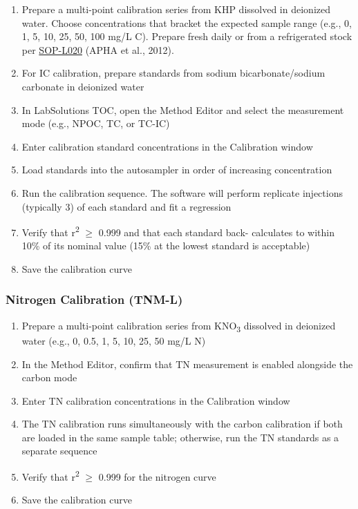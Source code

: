 \documentclass[
  11pt,
  letterpaper,
]{article}
\providecommand{\tightlist}{%
  \setlength{\itemsep}{0pt}\setlength{\parskip}{0pt}}
\begin{document}
\begin{enumerate}
\def\labelenumi{\arabic{enumi}.}
\tightlist
\item
  Prepare a multi-point calibration series from KHP dissolved in
  deionized water. Choose concentrations that bracket the expected
  sample range (e.g., 0, 1, 5, 10, 25, 50, 100 mg/L C). Prepare fresh
  daily or from a refrigerated stock per
  \href{SOP-L020-reagent-standard-preparation.qmd}{SOP-L020} (APHA et
  al., 2012).
\item
  For IC calibration, prepare standards from sodium bicarbonate/sodium
  carbonate in deionized water
\item
  In LabSolutions TOC, open the Method Editor and select the measurement
  mode (e.g., NPOC, TC, or TC-IC)
\item
  Enter calibration standard concentrations in the Calibration window
\item
  Load standards into the autosampler in order of increasing
  concentration
\item
  Run the calibration sequence. The software will perform replicate
  injections (typically 3) of each standard and fit a regression
\item
  Verify that r\textsuperscript{2} \(\geq\) 0.999 and that each standard
  back- calculates to within 10\% of its nominal value (15\% at the
  lowest standard is acceptable)
\item
  Save the calibration curve
\end{enumerate}

\subsubsection{Nitrogen Calibration
(TNM-L)}\label{nitrogen-calibration-tnm-l}

\begin{enumerate}
\def\labelenumi{\arabic{enumi}.}
\tightlist
\item
  Prepare a multi-point calibration series from KNO\textsubscript{3}
  dissolved in deionized water (e.g., 0, 0.5, 1, 5, 10, 25, 50 mg/L N)
\item
  In the Method Editor, confirm that TN measurement is enabled alongside
  the carbon mode
\item
  Enter TN calibration concentrations in the Calibration window
\item
  The TN calibration runs simultaneously with the carbon calibration if
  both are loaded in the same sample table; otherwise, run the TN
  standards as a separate sequence
\item
  Verify that r\textsuperscript{2} \(\geq\) 0.999 for the nitrogen curve
\item
  Save the calibration curve
\end{enumerate}
\end{document}
